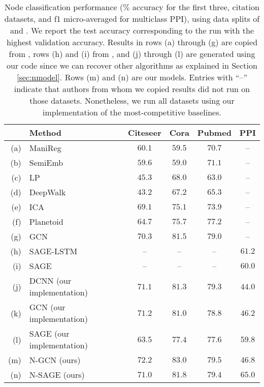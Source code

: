\begin{table*}[t]
\begin{center}
\begin{tabular}{rlcccc}
& \textbf{Method}  & \textbf{Citeseer} & \textbf{Cora} & \textbf{Pubmed} & \textbf{PPI} \\ \hline
(a) & ManiReg \citep{manireg}& $60.1$ & $59.5$ & $70.7$ & --\\ 

(b) & SemiEmb \citep{semiemb}& $59.6$ & $59.0$ & $71.1$ & --\\ 

(c) & LP \citep{lp}& $45.3$ & $68.0$ & $63.0$ & --\\ 

(d) & DeepWalk \citep{deepwalk}& $43.2$ & $67.2$ & $65.3$ & --\\ 

(e) & ICA \citep{ica}& $69.1$ & $75.1$ & $73.9$ & --\\ 

(f) & Planetoid \citep{planetoid}& $64.7$ & $75.7$ & $77.2$ & --\\ 

(g) & GCN \citep{kipf}& $70.3$ & $81.5$ & $79.0$ & --\\ 

(h) & SAGE-LSTM \citep{sage}& --& --& --& $61.2$ \\ 

(i) & SAGE \citep{sage}& --& --& --& $60.0$ \\ 

\hline
(j) & DCNN (our implementation)& $71.1$ & $81.3$ & $79.3$ & $44.0$ \\ 

(k) & GCN (our implementation)& $71.2$ & $81.0$ & $78.8$ & $46.2$ \\ 

(l) & SAGE (our implementation)& $63.5$ & $77.4$ & $77.6$ & $59.8$ \\ 

\hline
(m) & $\textrm{N-GCN}$ (ours)& $\mathbf{72.2}$ & $\mathbf{83.0}$ & $\mathbf{79.5}$ & $46.8$ \\ 

(n) & $\textrm{N-SAGE}$ (ours)& $71.0$ & $81.8$ & $79.4$ & $\mathbf{65.0}$ \\ 

\end{tabular}
 \end{center}
\caption{
Node classification performance ($\%$ accuracy for the first three, citation datasets, and f1 micro-averaged for multiclass PPI), using data splits of \cite{planetoid, kipf} and \cite{sage}.
We report the test accuracy corresponding to the run with the highest validation accuracy.
Results in rows (a) through (g) are copied from \cite{kipf}, rows (h) and (i) from \citep{sage}, and (j) through (l) are generated using our code since we can recover other algorithms as explained in Section \ref{sec:nmodel}. Rows (m) and (n) are our models.
Entries with ``--'' indicate that authors from whom we copied results did not run on those datasets. Nonetheless, we run all datasets using our implementation of the most-competitive baselines.
}
\label{table:results}
\end{table*}

